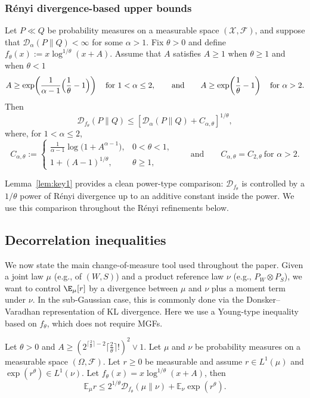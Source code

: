 \documentclass[11pt]{article}
\providecommand{\DD}{\mathcal{D}}
\providecommand{\Renyi}{R\'enyi }
\begin{document}
\subsubsection{\Renyi divergence-based upper bounds}

\begin{lemma}\label{lem:key1}
Let \(P\ll Q\) be probability measures on a measurable space \((\mathcal X,\mathcal F)\), and suppose that
\(\DD_\alpha(P\|Q)<\infty\) for some \(\alpha>1\). Fix \(\theta>0\) and define
\(f_\theta(x):=x\log^{1/\theta}(x+A)\).
Assume that \(A\) satisfies $A\geq 1$ when $\theta\geq1$ and when $\theta<1$
\[
A \ge \exp\!\left(\frac{1}{\alpha-1}\Bigl(\frac{1}{\theta}-1\Bigr)\right)\quad \text{for }1<\alpha\le 2,
\qquad\text{and}\qquad
A \ge \exp\!\left(\frac{1}{\theta}-1\right)\quad \text{for }\alpha>2.
\]
Then
\begin{equation}\label{eq:DF1}
\DD_{f_\theta}(P\|Q) \le [\DD_\alpha(P\|Q)+C_{\alpha,\theta}]^{1/\theta},
\end{equation}
where, for \(1<\alpha\le 2\),
\[
C_{\alpha,\theta}
:=
\begin{cases}
\displaystyle \frac{1}{\alpha-1}\log\bigl(1+A^{\alpha-1}\bigr), & 0<\theta<1,\\[0.9em]
1+(A-1)^{1/\theta}, & \theta\ge 1,
\end{cases}
\qquad\text{and}\qquad
C_{\alpha,\theta}=C_{2,\theta}\ \text{for }\alpha>2.
\]
\end{lemma}

Lemma~\ref{lem:key1} provides a clean {power-type} comparison:
$\DD_{f_\theta}$ is controlled by a $1/\theta$ power of R\'enyi divergence up to
an additive constant inside the power. We use this comparison throughout the
R\'enyi refinements below.


\subsection{Decorrelation inequalities}\label{sub:decorr}

We now state the main change-of-measure tool used throughout the paper.
Given a joint law $\mu$ (e.g., of $(W,S)$) and a product reference law $\nu$
(e.g., $P_W\otimes P_S$), we want to control $\E_\mu[r]$ by a divergence between
$\mu$ and $\nu$ plus a moment term under $\nu$.  In the sub-Gaussian case, this
is commonly done via the Donsker--Varadhan representation of KL divergence.
Here we use a Young-type inequality based on $f_\theta$, which does not require
MGFs.

\begin{lemma}\label{de}
Let $\theta>0$ and $A\ge (2^{\lceil \frac{2}{\theta} \rceil-2} \lceil \frac{2}{\theta} \rceil !)^2 \vee 1$. Let $\mu$ and $\nu$ be probability measures on a
measurable space $(\Omega,\mathcal F)$. Let $r\ge 0$ be measurable and assume
$r\in L^1(\mu)$ and $\exp(r^\theta)\in L^1(\nu)$. Let $f_\theta(x)=x\log^{1/\theta}(x+A)$, then
\begin{equation}\label{eq:dec}
\mathbb E_\mu r
\le 2^{1/\theta}\DD_{f_\theta}(\mu\|\nu)+\mathbb{E}_\nu\exp(r^\theta).
\end{equation}
\end{lemma}
\end{document}
